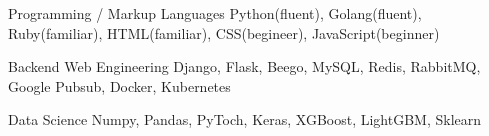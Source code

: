 

\begin{cvskills}


  \cvskill
    {Programming / Markup Languages} %
    {Python(fluent), Golang(fluent), Ruby(familiar), HTML(familiar), CSS(begineer), JavaScript(beginner)} %

  \cvskill
    {Backend Web Engineering} %
    {Django, Flask, Beego, MySQL, Redis, RabbitMQ, Google Pubsub, Docker, Kubernetes} %

  \cvskill
    {Data Science}
    {Numpy, Pandas, PyToch, Keras, XGBoost, LightGBM, Sklearn}



\end{cvskills}
